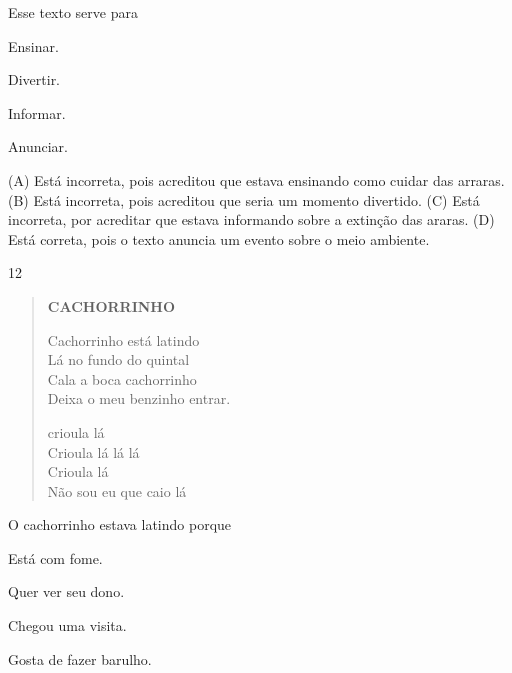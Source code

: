 
Esse texto serve para

\begin{minipage}{.5\textwidth}
\begin{escolha}
\item Ensinar.

\item Divertir.

\item Informar.

\item Anunciar.
\end{escolha}
\end{minipage}

(A) Está incorreta, pois acreditou que estava ensinando como cuidar das arraras.
(B) Está incorreta, pois acreditou que seria um momento divertido.
(C) Está incorreta, por acreditar que estava informando sobre a extinção das araras.
(D) Está correta, pois o texto anuncia um evento sobre o meio ambiente.

\num{12}

\begin{verse}
\textbf{CACHORRINHO}

Cachorrinho está latindo\\
Lá no fundo do quintal\\
Cala a boca cachorrinho\\
Deixa o meu benzinho entrar.

crioula lá\\
Crioula lá lá lá\\
Crioula lá\\
Não sou eu que caio lá
\end{verse}


O cachorrinho estava latindo porque

\begin{escolha}
\item Está com fome.

\item Quer ver seu dono.

\item Chegou uma visita.

\item Gosta de fazer barulho.
\end{escolha}

